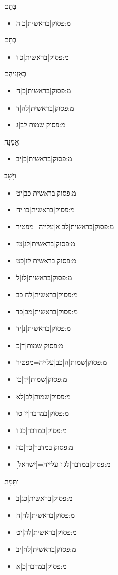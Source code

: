 \begin{itemize}
{{{{{{{{{{\begin{itemize}
\end{itemize}
 \item בְּתׇם
\begin{itemize} \item {{מ:פסוק|בראשית|כ|ה}}
\end{itemize}
 \item בְתׇם
\begin{itemize} \item {{מ:פסוק|בראשית|כ|ו}}
\end{itemize}
 \item בְּאׇזְנֵיהֶם
\begin{itemize} \item {{מ:פסוק|בראשית|כ|ח}}\item {{מ:פסוק|בראשית|לה|ד}}\item {{מ:פסוק|שמות|לב|ג}}
\end{itemize}
 \item אׇמְנָה
\begin{itemize} \item {{מ:פסוק|בראשית|כ|יב}}
\end{itemize}
 \item וַיָּשׇׁב
\begin{itemize} \item {{מ:פסוק|בראשית|כב|יט}}\item {{מ:פסוק|בראשית|כו|יח}}\item {{מ:פסוק|בראשית|לב|א|עלייה=מפטיר}}\item {{מ:פסוק|בראשית|לג|טז}}\item {{מ:פסוק|בראשית|לז|כט}}\item {{מ:פסוק|בראשית|לז|ל}}\item {{מ:פסוק|בראשית|לח|כב}}\item {{מ:פסוק|בראשית|מב|כד}}\item {{מ:פסוק|בראשית|נ|יד}}\item {{מ:פסוק|שמות|ד|כ}}\item {{מ:פסוק|שמות|ה|כב|עלייה=מפטיר}}\item {{מ:פסוק|שמות|יד|כז}}\item {{מ:פסוק|שמות|לב|לא}}\item {{מ:פסוק|במדבר|יז|טו}}\item {{מ:פסוק|במדבר|כג|ו}}\item {{מ:פסוק|במדבר|כד|כה}}\item {{מ:פסוק|במדבר|לג|ז|עלייה=[ישראל]}}
\end{itemize}
 \item וַתָּמׇת
\begin{itemize} \item {{מ:פסוק|בראשית|כג|ב}}\item {{מ:פסוק|בראשית|לה|ח}}\item {{מ:פסוק|בראשית|לה|יט}}\item {{מ:פסוק|בראשית|לח|יב}}\item {{מ:פסוק|במדבר|כ|א}}

\end{itemize}}}}}}}}}}}
\end{itemize}
